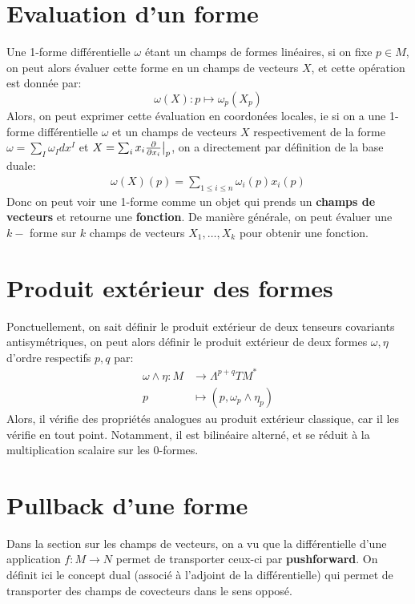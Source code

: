    \section{Evaluation d'un forme}
      Une 1-forme différentielle \( \omega \) étant un champs de formes linéaires, si on fixe \( p \in M \), on peut alors évaluer cette forme en un champs de vecteurs \( X \), et cette opération est donnée par:
      \[ 
         \omega(X) : p \longmapsto \omega_p(X_p)
      \]
      Alors, on peut exprimer cette évaluation en coordonées locales, ie si on a une 1-forme différentielle \( \omega \) et un champs de vecteurs \( X \) respectivement de la forme \( \omega = \sum_I \omega_I dx^I \) et \( X = \sum_i x_i \frac{\partial }{\partial x_i}\big|_p\), on a directement par définition de la base duale:
      \begin{align*}
         \omega(X)(p) = \sum_{1 \leq i \leq n} \omega_{i}(p)x_i(p)
      \end{align*} 
      Donc on peut voir une 1-forme comme un objet qui prends un \textbf{champs de vecteurs} et retourne une \textbf{fonction}. De manière générale, on peut évaluer une \( k-\) forme sur \( k \) champs de vecteurs \( X_1, \ldots, X_k \) pour obtenir une fonction.
   \section{Produit extérieur des formes}
      Ponctuellement, on sait définir le produit extérieur de deux tenseurs covariants antisymétriques, on peut alors définir le produit extérieur de deux formes \( \omega, \eta \) d'ordre respectifs \( p, q \) par:
      \[ 
         \begin{aligned}
            \omega \wedge \eta : M &\longrightarrow \Lambda^{p+q}TM^* \\
            p &\longmapsto (p, \omega_p \wedge \eta_p)
         \end{aligned}
      \]
      Alors, il vérifie des propriétés analogues au produit extérieur classique, car il les vérifie en tout point. Notamment, il est bilinéaire alterné, et se réduit à la multiplication scalaire sur les 0-formes.
   \section{Pullback d'une forme}
   Dans la section sur les champs de vecteurs, on a vu que la différentielle d'une application \( f : M \longrightarrow N \) permet de transporter ceux-ci par \textbf{pushforward}. On définit ici le concept dual (associé à l'adjoint de la différentielle) qui permet de transporter des champs de covecteurs dans le sens opposé.\<

